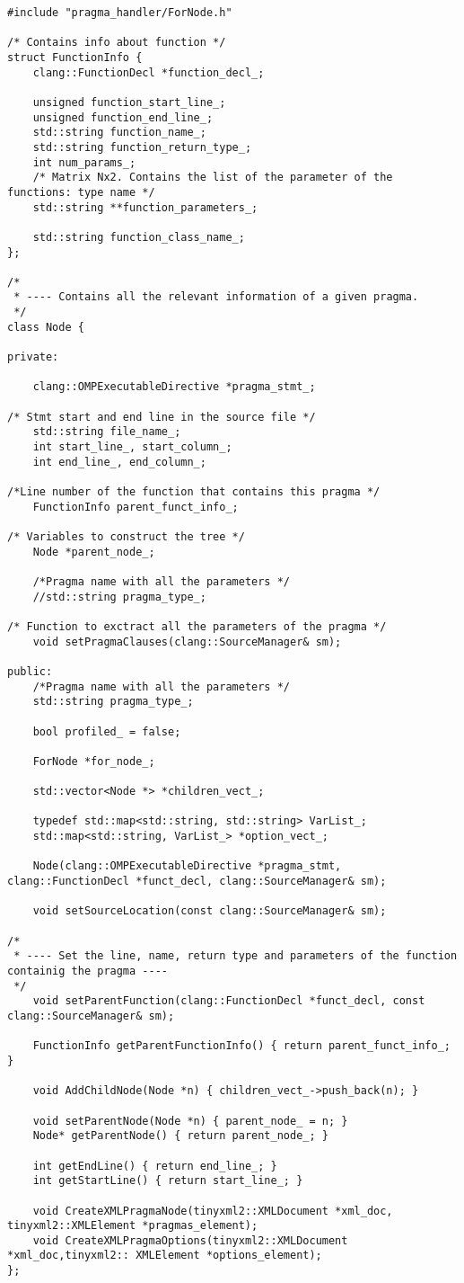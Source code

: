 \documentclass[a4paper,10pt,twoside]{book}
\begin{document}
\begin{lstlisting}[language=CCC, caption=pragma\_handler/Node.h]
#include "pragma_handler/ForNode.h"

/* Contains info about function */
struct FunctionInfo {
	clang::FunctionDecl *function_decl_;

	unsigned function_start_line_;
	unsigned function_end_line_;
	std::string function_name_;
	std::string function_return_type_;
	int num_params_;
	/* Matrix Nx2. Contains the list of the parameter of the functions: type name */
	std::string **function_parameters_;

	std::string function_class_name_;
};

/*
 * ---- Contains all the relevant information of a given pragma.
 */
class Node {

private:

	clang::OMPExecutableDirective *pragma_stmt_;

/* Stmt start and end line in the source file */
	std::string file_name_;
	int start_line_, start_column_;
	int end_line_, end_column_;

/*Line number of the function that contains this pragma */
	FunctionInfo parent_funct_info_;

/* Variables to construct the tree */
	Node *parent_node_;

	/*Pragma name with all the parameters */
	//std::string pragma_type_;

/* Function to exctract all the parameters of the pragma */
	void setPragmaClauses(clang::SourceManager& sm);

public:
	/*Pragma name with all the parameters */
	std::string pragma_type_;

	bool profiled_ = false;

	ForNode *for_node_;

	std::vector<Node *> *children_vect_;

	typedef std::map<std::string, std::string> VarList_;
	std::map<std::string, VarList_> *option_vect_;

	Node(clang::OMPExecutableDirective *pragma_stmt, clang::FunctionDecl *funct_decl, clang::SourceManager& sm);

	void setSourceLocation(const clang::SourceManager& sm);

/*
 * ---- Set the line, name, return type and parameters of the function containig the pragma ----
 */
	void setParentFunction(clang::FunctionDecl *funct_decl, const clang::SourceManager& sm);

	FunctionInfo getParentFunctionInfo() { return parent_funct_info_; }

	void AddChildNode(Node *n) { children_vect_->push_back(n); }

	void setParentNode(Node *n) { parent_node_ = n; }
	Node* getParentNode() { return parent_node_; }

	int getEndLine() { return end_line_; }
	int getStartLine() { return start_line_; }

	void CreateXMLPragmaNode(tinyxml2::XMLDocument *xml_doc, tinyxml2::XMLElement *pragmas_element);
	void CreateXMLPragmaOptions(tinyxml2::XMLDocument *xml_doc,tinyxml2:: XMLElement *options_element);
};
\end{lstlisting}
\end{document}
